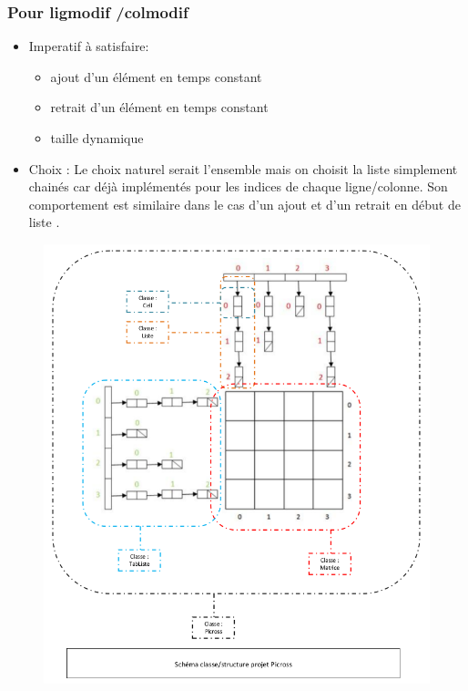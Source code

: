 \documentclass{article}
\begin{document}
\subsubsection{Pour ligmodif /colmodif}
\begin{itemize}
\item Imperatif \`a satisfaire:
\begin{itemize}
\item ajout d'un \'el\'ement en temps constant
\item retrait d'un \'el\'ement en temps constant
\item taille dynamique
\end{itemize}
\item Choix :
Le choix naturel serait l'ensemble mais on choisit la liste simplement chain\'es car d\'ej\`a  impl\'ement\'es pour les indices de chaque ligne/colonne. Son
comportement est similaire dans le cas d'un ajout et d'un retrait en d\'ebut de liste .
\end{itemize}
\begin{landscape}
\begin{figure}
\begin{center}
\includegraphics[width=14cm]{./images/recapitulatif_stucture.png}
\end{center}
\end{figure}
\end{landscape}
\newpage
\end{document}

